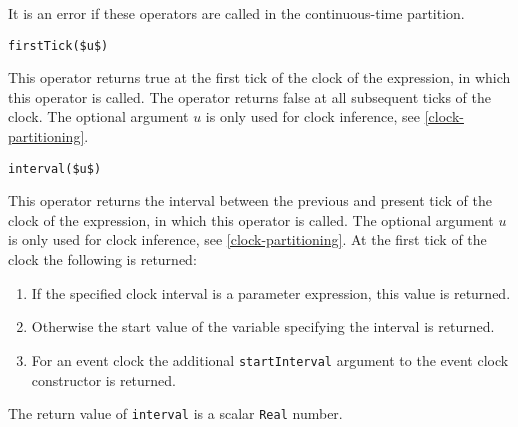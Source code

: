 It is an error if these operators are called in the continuous-time partition.

\begin{operatordefinition}[firstTick]
\begin{synopsis}\begin{lstlisting}
firstTick($u$)
\end{lstlisting}\end{synopsis}
\begin{semantics}
This operator returns true at the first tick of the clock of the expression, in which this operator is called.  The operator returns false at all subsequent ticks of the clock.  The optional argument $u$ is only used for clock inference, see \cref{clock-partitioning}.
\end{semantics}
\end{operatordefinition}

\begin{operatordefinition}[interval]
\begin{synopsis}\begin{lstlisting}
interval($u$)
\end{lstlisting}\end{synopsis}
\begin{semantics}
This operator returns the interval between the previous and present tick of the clock of the expression, in which this operator is called.  The optional argument $u$ is only used for clock inference, see \cref{clock-partitioning}.  At the first tick of the clock the following is returned:
\begin{enumerate}
\item If the specified clock interval is a parameter expression, this value is returned.
\item Otherwise the start value of the variable specifying the interval is returned.
\item For an event clock the additional \lstinline!startInterval! argument to the event clock constructor is returned.
\end{enumerate}
The return value of \lstinline!interval! is a scalar \lstinline!Real! number.
\end{semantics}
\end{operatordefinition}

